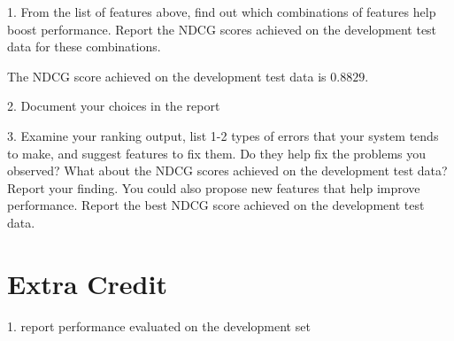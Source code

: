 1. From the list of features above, find out which combinations of features help boost
performance. Report the NDCG scores achieved on the development test data
for these combinations.

The NDCG score achieved on the development test data is $0.8829$.

2. Document your choices in the report

3.
Examine your ranking output, list 1-2 types of errors that your system tends
to make, and suggest features to fix them. Do they help fix the problems you
observed? What about the NDCG scores achieved on the development test data?
Report your finding.
You could also propose new features that help improve performance. Report the
best NDCG score achieved on the development test data.

\section{Extra Credit}
1. report performance evaluated on the development
set



